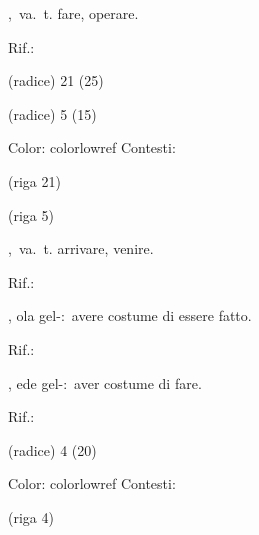 ,\ va.\ t.
fare, operare.
\begin{subvocedue}
\item[Rif.:] 
\end{subvocedue}
\begin{subvocedue}
\item[(radice)]   21 (25)
\item[(radice)]   5 (15)
\end{subvocedue}
Color: colorlowref
Contesti:
\begin{subvocedue}
\item[(riga 21)] 
\item[(riga 5)] 
\end{subvocedue}

,\ va.\ t.
arrivare, venire.
\begin{subvocedue}
\item[Rif.:] 
\end{subvocedue}
\begin{subvocedue}
\item[\subglossariobullet] , {\sf ola gel-}:\ avere costume di essere fatto.
\begin{subvocedue}
\item[Rif.:] 
\end{subvocedue}
\item[\subglossariobullet] , {\sf ede gel-}:\ aver costume di fare.
\begin{subvocedue}
\item[Rif.:] 
\end{subvocedue}
\item[(radice)]   4 (20)
\end{subvocedue}
Color: colorlowref
Contesti:
\begin{subvocedue}
\item[(riga 4)] 
\end{subvocedue}

